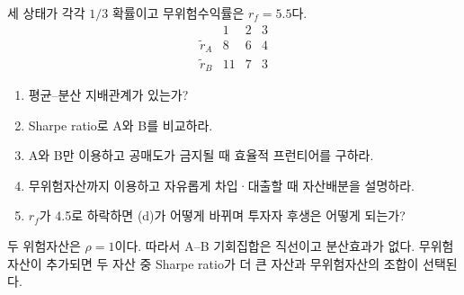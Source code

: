 \begin{officialbox}
세 상태가 각각 $1/3$ 확률이고 무위험수익률은 $r_f=5.5$다.
\[
\begin{array}{c|ccc}
&1&2&3\\\hline
\widetilde r_A&8&6&4\\
\widetilde r_B&11&7&3
\end{array}
\]
\begin{enumerate}[label=(\alph*)]
\item 평균--분산 지배관계가 있는가?
\item Sharpe ratio로 A와 B를 비교하라.
\item A와 B만 이용하고 공매도가 금지될 때 효율적 프런티어를 구하라.
\item 무위험자산까지 이용하고 자유롭게 차입·대출할 때 자산배분을 설명하라.
\item $r_f$가 4.5로 하락하면 (d)가 어떻게 바뀌며 투자자 후생은 어떻게 되는가?
\end{enumerate}
\end{officialbox}

\begin{strategybox}
두 위험자산은 $\rho=1$이다. 따라서 A--B 기회집합은 직선이고 분산효과가 없다. 무위험자산이 추가되면 두 자산 중 Sharpe ratio가 더 큰 자산과 무위험자산의 조합이 선택된다.
\end{strategybox}


